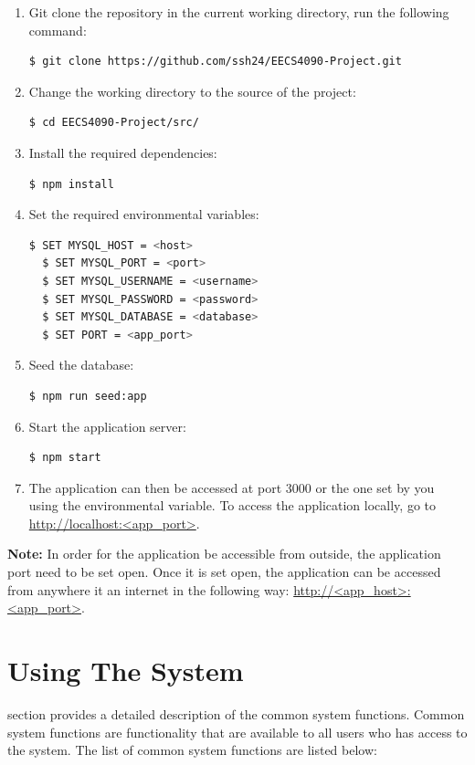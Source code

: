 \documentclass[fontsize=12pt,paper=letter,twoside]{scrartcl}
\begin{document}
\smallskip
\begin{enumerate}
\item Git clone the repository in the current working directory, run the following command:
\begin{lstlisting}[language=bash]
  $ git clone https://github.com/ssh24/EECS4090-Project.git
\end{lstlisting}
\item Change the working directory to the source of the project:
\begin{lstlisting}[language=bash]
  $ cd EECS4090-Project/src/
\end{lstlisting}
\item Install the required dependencies:
\begin{lstlisting}[language=bash]
  $ npm install
\end{lstlisting}
\item Set the required environmental variables:
\begin{lstlisting}[language=bash]
  $ SET MYSQL_HOST = <host>
  $ SET MYSQL_PORT = <port>
  $ SET MYSQL_USERNAME = <username>
  $ SET MYSQL_PASSWORD = <password>
  $ SET MYSQL_DATABASE = <database>
  $ SET PORT = <app_port>
\end{lstlisting}
\item Seed the database:
\begin{lstlisting}[language=bash]
  $ npm run seed:app
\end{lstlisting}
\item Start the application server:
\begin{lstlisting}[language=bash]
  $ npm start
\end{lstlisting}
\item The application can then be accessed at port 3000 or the one set by you using the environmental variable. To access the application locally, go to \url{http://localhost:<app_port>}.
\end{enumerate}

\bigskip
\noindent \textbf{Note:} In order for the application be accessible from outside, the application port need to be set open. Once it is set open, the application can be accessed from anywhere it an internet in the following way: \url{http://<app_host>:<app_port>}.

\newpage
\section{Using The System}
section provides a detailed description of the common system functions. Common system functions are functionality that are available to all users who has access to the system. The list of common system functions are listed below:
\end{document}
